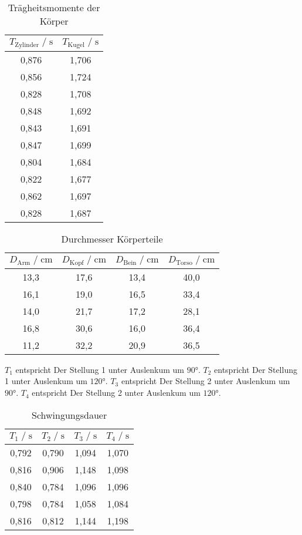 \begin{table}
    \centering
     \caption{Trägheitsmomente der Körper}
     \label{tab:traegheitsmomente}
     \begin{tabular}{c c}
        \toprule
        $ T_{\text{Zylinder}} \;/\; \si{\second}$ & $ T_{\text{Kugel}} \;/\; \si{\second}$ \\
        \midrule
        0,876 & 1,706 \\
        0,856 & 1,724 \\
        0,828 & 1,708 \\
        0,848 & 1,692 \\
        0,843 & 1,691 \\
        0,847 & 1,699 \\
        0,804 & 1,684 \\
        0,822 & 1,677 \\
        0,862 & 1,697 \\
        0,828 & 1,687 \\
        \bottomrule
     \end{tabular}
 \end{table}

\begin{table}
\centering
    \caption{Durchmesser Körperteile}
    \label{tab:durchmesser}
    \begin{tabular}{c c c c}
    \toprule
    $D_\text{Arm} \;/\; \si{\centi\meter}$ & $D_\text{Kopf} \;/\; \si{\centi\meter}$ & $D_\text{Bein} \;/\; \si{\centi\meter}$ & $D_\text{Torso} \;/\; \si{\centi\meter}$ \\
    \midrule
    13,3 & 17,6 & 13,4 & 40,0 \\
    16,1 & 19,0 & 16,5 & 33,4 \\
    14,0 & 21,7 & 17,2 & 28,1 \\
    16,8 & 30,6 & 16,0 & 36,4 \\
    11,2 & 32,2 & 20,9 & 36,5 \\
    \bottomrule
    \end{tabular}
\end{table}

$T_1$ entspricht Der Stellung 1 unter Auslenkum um $90°$.
$T_2$ entspricht Der Stellung 1 unter Auslenkum um $120°$.
$T_3$ entspricht Der Stellung 2 unter Auslenkum um $90°$.
$T_4$ entspricht Der Stellung 2 unter Auslenkum um $120°$.

\begin{table}
    \centering
        \caption{Schwingungsdauer}
        \label{tab:schwingdauer}
        \begin{tabular}{c c c c}
        \toprule
        $T_1 \;/\; \si{\second}$ & $T_2 \;/\; \si{\second}$ & $T_3 \;/\; \si{\second}$ & $T_4 \;/\; \si{\second}$ \\
        \midrule
        0,792 & 0,790 & 1,094 & 1,070 \\
        0,816 & 0,906 & 1,148 & 1,098 \\
        0,840 & 0,784 & 1,096 & 1,096 \\
        0,798 & 0,784 & 1,058 & 1,084 \\
        0,816 & 0,812 & 1,144 & 1,198 \\
        \bottomrule
        \end{tabular}
    \end{table}